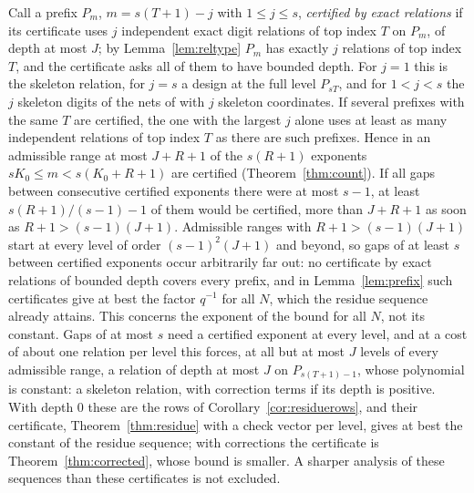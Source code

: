 \begin{remark}\label{rem:exactgaps}
Call a prefix $P_m$, $m=s(T+1)-j$ with $1\le j\le s$, \emph{certified by exact relations} if its certificate uses $j$ independent exact digit relations of top index $T$ on $P_m$, of depth at most $J$; by Lemma~\ref{lem:reltype} $P_m$ has exactly $j$ relations of top index $T$, and the certificate asks all of them to have bounded depth. For $j=1$ this is the skeleton relation, for $j=s$ a design at the full level $P_{sT}$, and for $1<j<s$ the $j$ skeleton digits of the nets of \cite{Gru26geo} with $j$ skeleton coordinates. If several prefixes with the same $T$ are certified, the one with the largest $j$ alone uses at least as many independent relations of top index $T$ as there are such prefixes. Hence in an admissible range at most $J+R+1$ of the $s(R+1)$ exponents $sK_0\le m<s(K_0+R+1)$ are certified (Theorem~\ref{thm:count}). If all gaps between consecutive certified exponents there were at most $s-1$, at least $s(R+1)/(s-1)-1$ of them would be certified, more than $J+R+1$ as soon as $R+1>(s-1)(J+1)$. Admissible ranges with $R+1>(s-1)(J+1)$ start at every level of order $(s-1)^2(J+1)$ and beyond, so gaps of at least $s$ between certified exponents occur arbitrarily far out: no certificate by exact relations of bounded depth covers every prefix, and in Lemma~\ref{lem:prefix} such certificates give at best the factor $q^{-1}$ for all $N$, which the residue sequence already attains. This concerns the exponent of the bound for all $N$, not its constant. Gaps of at most $s$ need a certified exponent at every level, and at a cost of about one relation per level this forces, at all but at most $J$ levels of every admissible range, a relation of depth at most $J$ on $P_{s(T+1)-1}$, whose polynomial is constant: a skeleton relation, with correction terms if its depth is positive. With depth $0$ these are the rows of Corollary~\ref{cor:residuerows}, and their certificate, Theorem~\ref{thm:residue} with a check vector per level, gives at best the constant of the residue sequence; with corrections the certificate is Theorem~\ref{thm:corrected}, whose bound is smaller. A sharper analysis of these sequences than these certificates is not excluded.
\end{remark}


